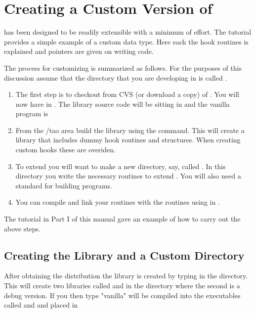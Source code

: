 
\chapter{Creating a Custom Version of \tao}
\label{c:prog_customizing} 

\tao has been designed to be readily extensible with a minimum of
effort. The tutorial provides a simple example of a custom data type. Here each
the hook routines is explained and pointers are given on writing code. 

The process for customizing is summarized as follows. For the purposes of this
discussion assume that the directory that you are developing \tao in
is called . 
\begin{enumerate}
\item 
The first step is to checkout from CVS (or download a
copy) of \tao. You will now have \tao in
. The library source code will be sitting in 
and the vanilla \tao program is 
\item 
From the /tao area build the \tao library using the
 command. This will create a \tao library that includes dummy hook
routines and structures. When creating custom hooks these are overiden.
\item
To extend \tao you will want to make a new
directory, say, called . In this directory you write
the necessary routines to extend \tao. You will also need a standard 
 for building programs.
\item
You can compile and link your routines with the \tao routines using
 in .
\end{enumerate}

The tutorial in Part I of this manual gave an example of how to carry out the
above steps.

\section{Creating the \tao Library and a Custom \tao Directory}

After obtaining the \tao distribution the \tao library is created by typing
 in the  directory. This will create two libraries
called  and  in the directory  where
the second is a debug version. If you then type  "vanilla"
\tao will be compiled into the executables called  and  and
placed in 


